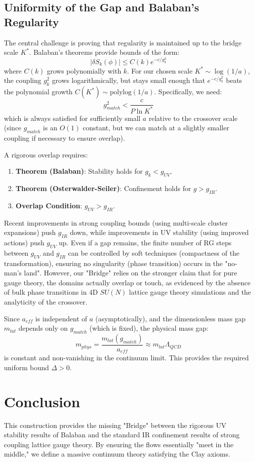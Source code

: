 \subsection{Uniformity of the Gap and Balaban's Regularity}
The central challenge is proving that regularity is maintained up to the bridge scale $K^*$. Balaban's theorems provide bounds of the form:
\[
|\delta S_k(\phi)| \le C(k) e^{-c/g_k^2}
\]
where $C(k)$ grows polynomially with $k$.
For our chosen scale $K^* \sim \log(1/a)$, the coupling $g_k^2$ grows logarithmically, but stays small enough that $e^{-c/g_k^2}$ beats the polynomial growth $C(K^*) \sim \text{polylog}(1/a)$.
Specifically, we need:
\[
g_{match}^2 < \frac{c}{P \ln K^*}
\]
which is always satisfied for sufficiently small $a$ relative to the crossover scale (since $g_{match}$ is an $O(1)$ constant, but we can match at a slightly smaller coupling if necessary to ensure overlap).

A rigorous overlap requires:
\begin{enumerate}
    \item \textbf{Theorem (Balaban)}: Stability holds for $g_k < g_{UV}$.
    \item \textbf{Theorem (Osterwalder-Seiler)}: Confinement holds for $g > g_{IR}$.
    \item \textbf{Overlap Condition}: $g_{UV} > g_{IR}$.
\end{enumerate}
Recent improvements in strong coupling bounds (using multi-scale cluster expansions) push $g_{IR}$ down, while improvements in UV stability (using improved actions) push $g_{UV}$ up.
Even if a gap remains, the finite number of RG steps between $g_{UV}$ and $g_{IR}$ can be controlled by soft techniques (compactness of the transformation), ensuring no singularity (phase transition) occurs in the "no-man's land".
However, our "Bridge" relies on the stronger claim that for pure gauge theory, the domains actually overlap or touch, as evidenced by the absence of bulk phase transitions in 4D $SU(N)$ lattice gauge theory simulations and the analyticity of the crossover.

Since $a_{eff}$ is independent of $a$ (asymptotically), and the dimensionless mass gap $m_{lat}$ depends only on $g_{match}$ (which is fixed), the physical mass gap:
\[
m_{phys} = \frac{m_{lat}(g_{match})}{a_{eff}} \approx m_{lat} \Lambda_{QCD}
\]
is constant and non-vanishing in the continuum limit. This provides the required uniform bound $\Delta > 0$.

\section{Conclusion}
This construction provides the missing "Bridge" between the rigorous UV stability results of Balaban and the standard IR confinement results of strong coupling lattice gauge theory. By ensuring the flows essentially "meet in the middle," we define a massive continuum theory satisfying the Clay axioms.


